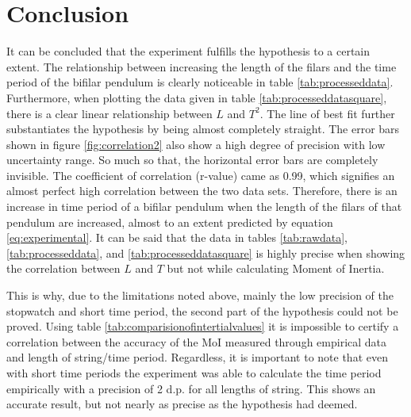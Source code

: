 \documentclass[a4paper,12pt]{article}
\theoremstyle{definition}
\begin{document}
\newpage
\section{Conclusion}
It can be concluded that the experiment fulfills the hypothesis to a certain extent. The relationship between increasing the length of the filars and the time period of the bifilar pendulum is clearly noticeable in table \ref{tab:processeddata}. Furthermore, when plotting the data given in table \ref{tab:processeddatasquare}, there is a clear linear relationship between $L$ and $T^2$. The line of best fit further substantiates the hypothesis by being almost completely straight. The error bars shown in figure \ref{fig:correlation2} also show a high degree of precision with low uncertainty range. So much so that, the horizontal error bars are completely invisible. The coefficient of correlation (r-value) came as 0.99, which signifies an almost perfect high correlation between the two data sets. Therefore, there is an increase in time period of a bifilar pendulum when the length of the filars of that pendulum are increased, almost to an extent predicted by equation \ref{eq:experimental}. It can be said that the data in tables \ref{tab:rawdata}, \ref{tab:processeddata}, and \ref{tab:processeddatasquare} is highly precise when showing the correlation between $L$ and $T$ but not while calculating Moment of Inertia.

This is why, due to the limitations noted above, mainly the low precision of the stopwatch and short time period, the second part of the hypothesis could not be proved. Using table \ref{tab:comparisionofintertialvalues} it is impossible to certify a correlation between the accuracy of the MoI measured through empirical data and length of string/time period. Regardless, it is important to note that even with short time periods the experiment was able to calculate the time period empirically with a precision of 2 d.p. for all lengths of string. This shows an accurate result, but not nearly as precise as the hypothesis had deemed.
\end{document}
